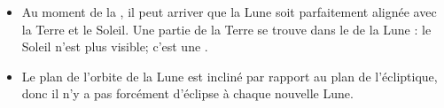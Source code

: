 \begin{mybilan}
	\begin{itemize}
		\item Au moment de la , il peut arriver que la Lune soit parfaitement alignée avec la Terre et le Soleil. Une partie de la Terre se trouve dans le  de la Lune : le Soleil n'est plus visible; c'est une .
		\item Le plan de l'orbite de la Lune est incliné par rapport au plan de l'écliptique, donc il n'y a pas forcément d'éclipse à chaque nouvelle Lune.
	\end{itemize}
\end{mybilan}